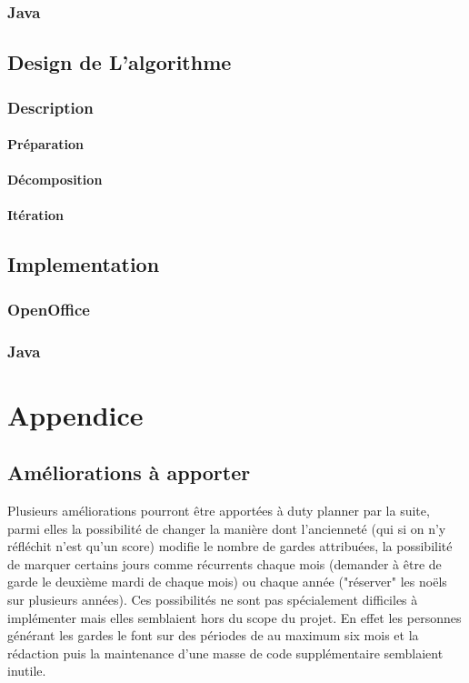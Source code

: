 \documentclass[11pt]{report}
\begin{document}
\subsection{Java}
\section{Design de L'algorithme}
\subsection{Description}
\subsubsection{Préparation}
\subsubsection{Décomposition}
\subsubsection{Itération}
\section{Implementation}
\subsection{OpenOffice}
\subsection{Java}

\chapter{Appendice}
\section{Améliorations à apporter}
Plusieurs améliorations pourront être apportées à duty planner par la suite, parmi elles la possibilité de changer la manière dont l'ancienneté (qui si on n'y réfléchit n'est qu'un score) modifie le nombre de gardes attribuées, la possibilité de marquer certains jours comme récurrents chaque mois (demander à être de garde le deuxième mardi de chaque mois) ou chaque année ("réserver" les noëls sur plusieurs années).
 Ces possibilités ne sont pas spécialement difficiles à implémenter mais elles semblaient hors du scope du projet. 
En effet les personnes générant les gardes le font sur des périodes de au maximum six mois et la rédaction puis la maintenance d'une masse de code supplémentaire semblaient inutile\cite{yagn}.
\end{document}
